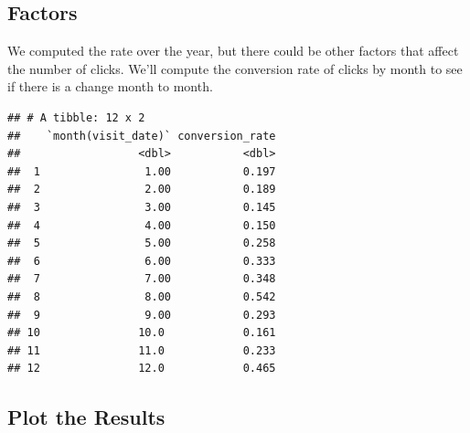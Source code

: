 \documentclass[]{article}
\newenvironment{Shaded}{\begin{snugshade}}{\end{snugshade}}
\newcommand{\KeywordTok}[1]{\textcolor[rgb]{0.13,0.29,0.53}{\textbf{#1}}}
\newcommand{\DataTypeTok}[1]{\textcolor[rgb]{0.13,0.29,0.53}{#1}}
\newcommand{\StringTok}[1]{\textcolor[rgb]{0.31,0.60,0.02}{#1}}
\newcommand{\OperatorTok}[1]{\textcolor[rgb]{0.81,0.36,0.00}{\textbf{#1}}}
\newcommand{\NormalTok}[1]{#1}
\begin{document}
\subsection{Factors}\label{factors}

We computed the rate over the year, but there could be other factors
that affect the number of clicks. We'll compute the conversion rate of
clicks by month to see if there is a change month to month.

\begin{Shaded}
\end{Shaded}

\begin{verbatim}
## # A tibble: 12 x 2
##    `month(visit_date)` conversion_rate
##                  <dbl>           <dbl>
##  1                1.00           0.197
##  2                2.00           0.189
##  3                3.00           0.145
##  4                4.00           0.150
##  5                5.00           0.258
##  6                6.00           0.333
##  7                7.00           0.348
##  8                8.00           0.542
##  9                9.00           0.293
## 10               10.0            0.161
## 11               11.0            0.233
## 12               12.0            0.465
\end{verbatim}

\subsection{Plot the Results}\label{plot-the-results}

\begin{Shaded}
\end{Shaded}
\end{document}
